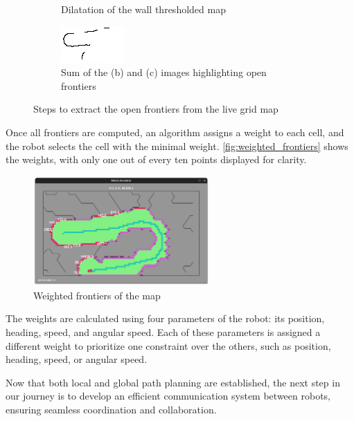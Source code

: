 \documentclass[../main.tex]{subfiles}
\begin{document}
\begin{figure}[H]
\begin{subfigure}[b]{0.45\textwidth}
		\caption{Dilatation of the wall thresholded map}
		\label{fig:subfigure3}
	\end{subfigure}
	\hfill
	\begin{subfigure}[b]{0.45\textwidth}
		\centering
		\includegraphics[width=\textwidth]{IMAGES/part3/sum_image.png}
		\caption{Sum of the (b) and (c) images highlighting open frontiers}
		\label{fig:subfigure4}
	\end{subfigure}
	\caption{Steps to extract the open frontiers from the live grid map}
	\label{fig:open_frontiers}
\end{figure}

Once all frontiers are computed, an algorithm assigns a weight to each cell, and the robot selects the cell with the minimal weight. \autoref{fig:weighted_frontiers} shows the weights, with only one out of every ten points displayed for clarity.

\begin{figure}[H]
	\centering
	\includegraphics[width=0.6\textwidth]{IMAGES/part3/weighted_fontiers.png}
	\caption{Weighted frontiers of the map}
	\label{fig:weighted_frontiers}
\end{figure}

The weights are calculated using four parameters of the robot: its position, heading, speed, and angular speed. Each of these parameters is assigned a different weight to prioritize one constraint over the others, such as position, heading, speed, or angular speed.

\vspace{1em}

Now that both local and global path planning are established, the next step in our journey is to develop an efficient communication system between robots, ensuring seamless coordination and collaboration.
\end{document}
